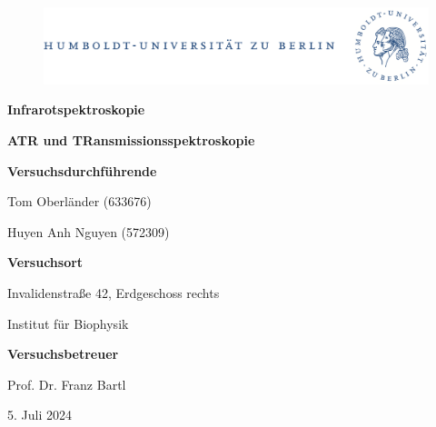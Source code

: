 \documentclass[10pt,a4paper]{article}
\begin{document}
	
	\begin{titlepage}
		\begin{center}
			\begin{figure}[h!tbp]
				\includegraphics[width=\linewidth]{HUlogo.PNG}
			\end{figure}
			\vspace*{2 cm}
			
			\textcolor{Bluetitle}{\textbf{\huge Infrarotspektroskopie}}\par
			\vspace*{0.5cm}
			\textcolor{softbluetitle}{\textbf{\Large ATR und TRansmissionsspektroskopie}}\par
			
			\vspace*{2cm}
			
			\textcolor{Greyish}{\textbf{Versuchsdurchführende}}\par
			\textcolor{Greyish}{Tom Oberländer (633676)}\par
			\textcolor{Greyish}{Huyen Anh Nguyen (572309)}\par
			
			\vspace*{0.5cm}
			\textcolor{Greyish}{\textbf{Versuchsort}}\par
			\textcolor{Greyish}{Invalidenstraße 42, Erdgeschoss rechts}\par
			\textcolor{Greyish}{Institut für Biophysik}\par
			\vspace*{0.5cm}
			\textcolor{Greyish}{\textbf{Versuchsbetreuer}}\par
			\textcolor{Greyish}{Prof. Dr. Franz Bartl}\par
			
			\vspace*{2 cm}
			
			\textcolor{Greyish}{5. Juli 2024}\par
			
			
			
			
		\end{center}
	\end{titlepage}
	
	\tableofcontents
	
\end{document}
